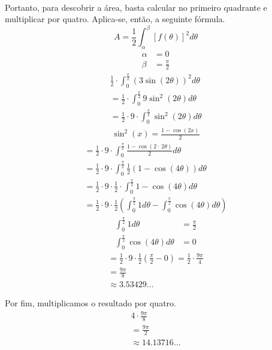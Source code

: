 \documentclass[a4paper,times,12pt]{article}
\begin{document}
\\
\par Portanto, para descobrir a área, basta calcular no primeiro quadrante e multiplicar por quatro. Aplica-se, então, a seguinte fórmula.
\[
	A=\frac{1}{2}\int_\alpha^\beta[f\left(\theta\right)]^2d\theta
\]
\begin{align*}
	\alpha&=0 \\
	\beta&=\frac{\pi}{2}
\end{align*}
\begin{gather*}
	\frac{1}{2}\cdot \int _0^{\frac{\pi }{2}}\left(3\sin \left(2\theta\right)\right)^2d\theta \\
	=\frac{1}{2}\cdot \int _0^{\frac{\pi }{2}}9\sin ^2\left(2\theta\right)d\theta \\
	=\frac{1}{2}\cdot 9\cdot \int _0^{\frac{\pi }{2}}\sin ^2\left(2\theta\right)d\theta
\end{gather*}
\begin{align*}
	\sin ^2\left(x\right)=\frac{1-\cos \left(2x\right)}{2}
\end{align*}
\begin{gather*}
	=\frac{1}{2}\cdot 9\cdot \int _0^{\frac{\pi }{2}}\frac{1-\cos \left(2\cdot \:2\theta\right)}{2}d\theta \\
	=\frac{1}{2}\cdot 9\cdot \int _0^{\frac{\pi }{2}}\frac{1}{2}\left(1-\cos \left(4\theta\right)\right)d\theta \\
	=\frac{1}{2}\cdot 9\cdot \frac{1}{2}\cdot \int _0^{\frac{\pi }{2}}1-\cos \left(4\theta\right)d\theta \\
	=\frac{1}{2}\cdot 9\cdot \frac{1}{2}\left(\int _0^{\frac{\pi }{2}}1d\theta-\int _0^{\frac{\pi }{2}}\cos \left(4\theta\right)d\theta\right)
\end{gather*}
\begin{align*}
	\int _0^{\frac{\pi }{2}}1d\theta&=\frac{\pi }{2} \\
	\int _0^{\frac{\pi }{2}}\cos \left(4\theta\right)d\theta&=0
\end{align*}
\begin{gather*}
	=\frac{1}{2}\cdot 9\cdot \frac{1}{2}\left(\frac{\pi }{2}-0\right)
	=\frac{1}{2}\cdot \frac{9\pi }{4} \\
	=\frac{9\pi }{8} \\
	\approx 3.53429\dots
\end{gather*}
\par Por fim, multiplicamos o resultado por quatro.
\begin{gather*}
	4\cdot \frac{9\pi }{8} \\
	=\frac{9\pi }{2} \\
	\approx 14.13716\dots
\end{gather*}
\end{document}
